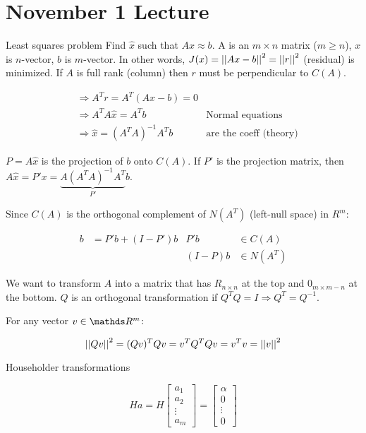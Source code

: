\section{November 1 Lecture}

Least squares problem
Find $\hat{x}$ such that $Ax \approx b$. A is an $m \times n$ matrix ($m \geq n$), $x$ is $n$-vector, $b$ is $m$-vector. In other words, $J(x) = \left|\left|Ax - b\right|\right|^2 = \left|\left|r\right|\right|^2$ (residual) is minimized. If $A$ is full rank (column) then $r$ must be perpendicular to $C(A)$.

\begin{align*}
  &\Rightarrow A^Tr = A^T(Ax-b) = 0\\
  &\Rightarrow A^TA\hat{x} = A^Tb &\text{Normal equations}\\
  &\Rightarrow \hat{x} = (A^T A)^{-1}A^T b &\text{are the coeff (theory)}
\end{align*}

$P = A \hat{x}$ is the projection of $b$ onto $C(A)$. If $P'$ is the projection matrix, then $A\hat{x} = P'x = \underbrace{A(A^TA)^{-1} A^T}_{P'} b$.

Since $C(A)$ is the orthogonal complement of $N(A^T)$ (left-null space) in $R^m$:

\begin{align*}
  b &= P'b+(I-P')b & P'b &\in C(A) \\
  & & (I-P)b &\in N(A^T)
\end{align*}

We want to transform $A$ into a matrix that has $R_{n \times n}$ at the top and $0_{m \times m-n}$ at the bottom. $Q$ is an orthogonal transformation if $Q^TQ = I \Rightarrow Q^T=Q^{-1}$.

For any vector $v \in \bbR^{m}$:

\[
  \left|\left|Qv\right|\right|^2 = (Qv)^T Qv = v^T Q^T Q v = v^T v = \left|\left|v\right|\right|^2
\]

Householder transformations

\[
  Ha = H \begin{bmatrix}
    a_1 \\ a_2 \\ \vdots \\ a_m
  \end{bmatrix}
  =
  \begin{bmatrix}
    \alpha \\ 0 \\ \vdots \\ 0
  \end{bmatrix}
\]


